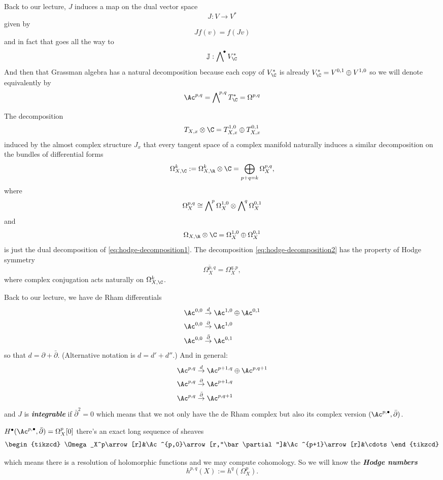 Back to our lecture, $J$ induces a map on the dual vector space
\[J:V\to V^*\]
given by
\[Jf(v)= f(Jv)\]
and in fact that goes all the way to
\[\mathbb{J}:\extp^{\bullet}V_{\C}^*\]
And then that Grassman algebra has a natural decomposition because each copy of $V^*_\C$ is already $V^*_{\C}=V^{0,1}\oplus V^{1,0}$ so we will denote equivalently by
\[\Ac^{p,q}=\extp^{p,q}T^*_{\C}=\Omega^{p,q}\]
\begin{remark}
	The decomposition
	\begin{equation}\label{eq:hodge-decomposition1}
		T_{X,x}\otimes\C=T^{1,0}_{X,x}\oplus T^{0,1}_{X,x}
	\end{equation}
	induced by the almost complex structure $J_x$ that every tangent space of a complex manifold naturally induces a similar decomposition on the bundles of differential forms
	\[\Omega_{X,\C}^k:=\Omega_{X,\R}^k\otimes\C=\bigoplus_{p+q=k}\Omega_X^{p,q},\]
	where
	\begin{equation}\label{eq:hodge-decomposition2}
		\Omega^{p,q}_X\cong \extp^p\Omega^{1,0}_X\otimes\extp^q\Omega^{0,1}_X
	\end{equation}
	and
	\[\Omega_{X,\R}\otimes\C=\Omega^{1,0}_X\oplus\Omega^{0,1}_X\]
	is just the dual decomposition of \cref{eq:hodge-decomposition1}. The decomposition \cref{eq:hodge-decomposition2} has the property of Hodge symmetry
	\[\overline{\Omega_X^{p,q}}=\Omega^{q,p}_X,\]
	where complex conjugation acts naturally on $\Omega^k_{X,\C}$.
\end{remark}
Back to our lecture, we have de Rham differentials 
\begin{align*}
	\Ac^{0,0}&\overset{d}{\to}\Ac^{1,0}\oplus\Ac^{0,1}\\
	\Ac^{0,0}&\overset{\partial}{\to}\Ac^{1,0}\\
	\Ac^{0,0}&\overset{\bar\partial}{\to}\Ac^{0,1}
\end{align*}
so that $d=\partial+\bar\partial$. (Alternative notation is $d=d'+d''$.) And in general:
\begin{align*}
	\Ac^{p,q}&\overset{d}{\to}\Ac^{p+1,q}\oplus\Ac^{p,q+1}\\
	\Ac^{p,q}&\overset{\partial}{\to}\Ac^{p+1,q}\\
	\Ac^{p,q}&\overset{\bar\partial}{\to}\Ac^{p,q+1}
\end{align*}
and $J$ is \textbf{\textit{integrable}} if $\bar\partial^2=0$ which means that we not only have the de Rham complex but also its complex version $(\Ac^{p,\bullet},\bar\partial)$.
\begin{lemma}
	$H^\bullet(\Ac^{p,\bullet},\bar\partial)=\Omega^p_X[0]$ there's an exact long sequence of sheaves
	\[\begin{tikzcd}
		\Omega_X^p\arrow[r]&\Ac^{p,0}\arrow[r,"\bar\partial"]&\Ac^{p+1}\arrow[r]&\cdots
	\end{tikzcd}\]
\end{lemma}
which means there is a resolution of holomorphic functions and we may compute cohomology. So we will know the \textbf{\textit{Hodge numbers}}
\[h^{p,q}(X):=h^q(\Omega^p_X).\]

